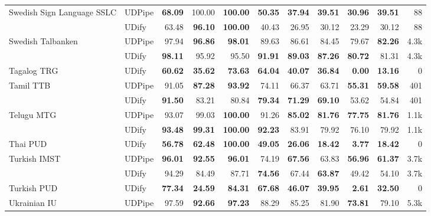 \documentclass[11pt,a4paper]{article}
\begin{document}
\begin{table*}
\begin{center}
\begin{tabular}{@{}llrrrrrrrrr@{}}
    \addlinespace
    Swedish Sign Language SSLC & UDPipe &  \bf 68.09 &     100.00 &  \bf 100.00 &  \bf 50.35 &  \bf 37.94 &  \bf 39.51 &  \bf 30.96 &  \bf 39.51 &     88 \\
               & UDify &      63.48 &  \bf 96.10 &  \bf 100.00 &      40.43 &      26.95 &      30.12 &      23.29 &      30.12 &     88 \\
    \addlinespace
    Swedish Talbanken & UDPipe &      97.94 &  \bf 96.86 &   \bf 98.01 &      89.63 &      86.61 &      84.45 &      79.67 &  \bf 82.26 &   4.3k \\
               & UDify &  \bf 98.11 &      95.92 &       95.50 &  \bf 91.91 &  \bf 89.03 &  \bf 87.26 &  \bf 80.72 &      81.31 &   4.3k \\
    \addlinespace
    Tagalog TRG & UDify &  \bf 60.62 &  \bf 35.62 &   \bf 73.63 &  \bf 64.04 &  \bf 40.07 &  \bf 36.84 &   \bf 0.00 &  \bf 13.16 &      0 \\
    \addlinespace
    Tamil TTB & UDPipe &      91.05 &  \bf 87.28 &   \bf 93.92 &      74.11 &      66.37 &      63.71 &  \bf 55.31 &  \bf 59.58 &    401 \\
               & UDify &  \bf 91.50 &      83.21 &       80.84 &  \bf 79.34 &  \bf 71.29 &  \bf 69.10 &      53.62 &      54.84 &    401 \\
    \addlinespace
    Telugu MTG & UDPipe &      93.07 &      99.03 &  \bf 100.00 &      91.26 &  \bf 85.02 &  \bf 81.76 &  \bf 77.75 &  \bf 81.76 &   1.1k \\
               & UDify &  \bf 93.48 &  \bf 99.31 &  \bf 100.00 &  \bf 92.23 &      83.91 &      79.92 &      76.10 &      79.92 &   1.1k \\
    \addlinespace
    Thai PUD & UDify &  \bf 56.78 &  \bf 62.48 &  \bf 100.00 &  \bf 49.05 &  \bf 26.06 &  \bf 18.42 &   \bf 3.77 &  \bf 18.42 &      0 \\
    \addlinespace
    Turkish IMST & UDPipe &  \bf 96.01 &  \bf 92.55 &   \bf 96.01 &      74.19 &  \bf 67.56 &      63.83 &  \bf 56.96 &  \bf 61.37 &   3.7k \\
               & UDify &      94.29 &      84.49 &       87.71 &  \bf 74.56 &      67.44 &  \bf 63.87 &      49.42 &      54.10 &   3.7k \\
    \addlinespace
    Turkish PUD & UDify &  \bf 77.34 &  \bf 24.59 &   \bf 84.31 &  \bf 67.68 &  \bf 46.07 &  \bf 39.95 &   \bf 2.61 &  \bf 32.50 &      0 \\
    \addlinespace
    Ukrainian IU & UDPipe &      97.59 &  \bf 92.66 &   \bf 97.23 &      88.29 &      85.25 &      81.90 &  \bf 73.81 &      79.10 &   5.3k \\

\end{tabular}
\end{center}
\end{table*}
\end{document}

